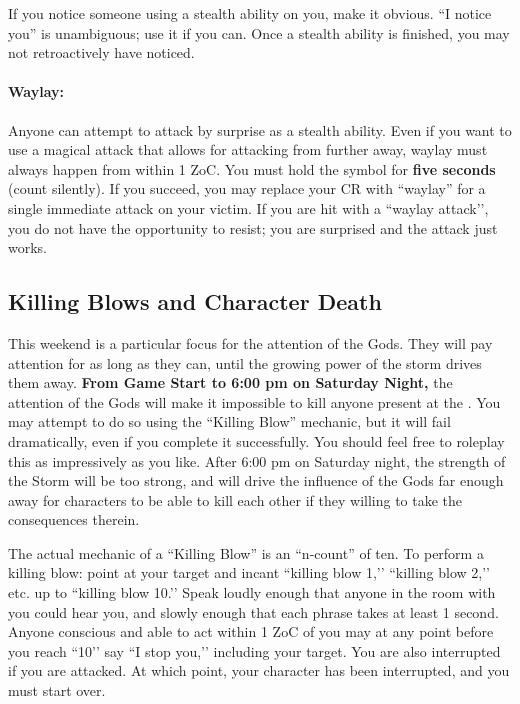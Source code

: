 \documentclass[sheet]{GL2020}
\begin{document}
If you notice someone using a stealth ability on you, make it obvious. ``I notice you'' is unambiguous; use it if you can. Once a stealth ability is finished, you may not retroactively have noticed.

\paragraph{Waylay:} Anyone can attempt to attack by surprise as a stealth ability. Even if you want to use a magical attack that allows for attacking from further away, waylay must always happen from within 1 ZoC. You must hold the symbol for \textbf{five seconds} (count silently). If you succeed, you may replace your CR with ``waylay'' for a single immediate attack on your victim. If you are hit with a ``waylay attack'’, you do not have the opportunity to resist; you are surprised and the attack just works.

\subsection{Killing Blows and Character Death}

This weekend is a particular focus for the attention of the Gods. They will pay attention for as long as they can, until the growing power of the storm drives them away. \textbf{From Game Start to 6:00 pm on Saturday Night,} the attention of the Gods will make it impossible to kill anyone present at the \pSc{}. You may attempt to do so using the ``Killing Blow'' mechanic, but it will fail dramatically, even if you complete it successfully. You should feel free to roleplay this as impressively as you like. After 6:00 pm on Saturday night, the strength of the Storm will be too strong, and will drive the influence of the Gods far enough away for characters to be able to kill each other if they willing to take the consequences therein.

The actual mechanic of a ``Killing Blow'' is an ``n-count'' of ten. To perform a killing blow: point at your target and incant ``killing blow 1,'’ ``killing blow 2,'’ etc. up to ``killing blow 10.'’ Speak loudly enough that anyone in the room with you could hear you, and slowly enough that each phrase takes at least 1 second. Anyone conscious and able to act within 1 ZoC of you may at any point before you reach ``10'’ say ``I stop you,'’ including your target. You are also interrupted if you are attacked. At which point, your character has been interrupted, and you must start over.
\end{document}

